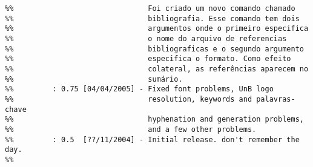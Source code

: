 \begin{verbatim}
%%                               Foi criado um novo comando chamado
%%                               bibliografia. Esse comando tem dois
%%                               argumentos onde o primeiro especifica
%%                               o nome do arquivo de referencias
%%                               bibliograficas e o segundo argumento
%%                               especifica o formato. Como efeito
%%                               colateral, as referências aparecem no
%%                               sumário.
%%         : 0.75 [04/04/2005] - Fixed font problems, UnB logo
%%                               resolution, keywords and palavras-chave
%%                               hyphenation and generation problems,
%%                               and a few other problems.
%%         : 0.5  [??/11/2004] - Initial release. don't remember the day.
%%
\end{verbatim}